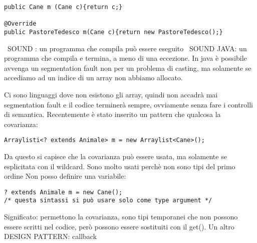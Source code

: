 \begin{lstlisting}[basicstyle=\small,]
public Cane m (Cane c){return c;}

@Override
public PastoreTedesco m(Cane c){return new PastoreTedesco();}
\end{lstlisting}

\noindent \textbullet\ SOUND : un programma che compila può essere eseguito \newline
\textbullet\ SOUND JAVA: un programma che compila e termina, a meno di una eccezione. \newline
In java è possibile avvenga un segmentation fault non per un problema di casting, ma solamente se accediamo ad un indice di un array non abbiamo allocato. \newline

\noindent Ci sono linguaggi dove non esistono gli array, quindi non accadrà mai segmentation fault e il codice terminerà sempre, ovviamente senza fare i controlli di semantica. \newline
Recentemente è stato inserito un pattern che qualcosa la covarianza: 

\begin{lstlisting}[basicstyle=\small,]
Arraylisti<? extends Animale> m = new Arraylist<Cane>();
\end{lstlisting}

Da questo si capisce che la covarianza può essere usata, ma solamente se esplicitata con il wildcard. \newline
Sono molto usati perchè non sono tipi del primo ordine \newline
Non posso definire una variabile: 

\begin{lstlisting}[basicstyle=\small,]
? extends Animale m = new Cane();
/* questa sintassi si può usare solo come type argument */
\end{lstlisting}
Significato: permettono la covarianza, sono tipi temporanei che non possono essere scritti nel codice, però possono essere sostituiti con il get(). \newline
Un altro DESIGN PATTERN: callback














